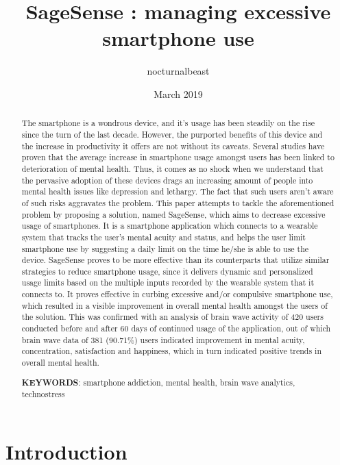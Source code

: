 \documentclass{article}
\title{SageSense : managing excessive smartphone use}
\author{nocturnalbeast}
\date{March 2019}
\begin{document}
\maketitle

\begin{abstract}
    The smartphone is a wondrous device, and it's usage has been steadily on the rise since the turn of the last decade. However, the purported benefits of this device and the increase in productivity it offers are not without its caveats. Several studies have proven that the average increase in smartphone usage amongst users has been linked to deterioration of mental health\cite{bian2015linking,twenge2017have,ward2017brain}. Thus, it comes as no shock when we understand that the pervasive adoption of these devices drags an increasing amount of people into mental health issues like depression and lethargy. The fact that such users aren't aware of such risks aggravates the problem. This paper attempts to tackle the aforementioned problem by proposing a solution, named SageSense, which aims to decrease excessive usage of smartphones. It is a smartphone application which connects to a wearable system that tracks the user's mental acuity and status, and helps the user limit smartphone use by suggesting a daily limit on the time he/she is able to use the device. SageSense proves to be more effective than its counterparts that utilize similar strategies to reduce smartphone usage, since it delivers dynamic and personalized usage limits based on the multiple inputs recorded by the wearable system that it connects to. It proves effective in curbing excessive and/or compulsive smartphone use, which resulted in a visible improvement in overall mental health amongst the users of the solution. This was confirmed with an analysis of brain wave activity of 420 users conducted before and after 60 days of continued usage of the application, out of which brain wave data of 381 (90.71\%) users indicated improvement in mental acuity, concentration, satisfaction and happiness, which in turn indicated positive trends in overall mental health.
    
    \textbf{KEYWORDS}: smartphone addiction, mental health, brain wave analytics, technostress
\end{abstract}

\newpage

\section{Introduction}
\end{document}
